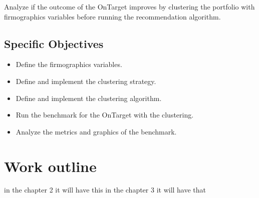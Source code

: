 Analyze if the outcome of the OnTarget improves by clustering the portfolio with firmographics variables before running the recommendation algorithm.

\subsection{Specific Objectives}

\begin{itemize}
    \item Define the firmographics variables.
    \item Define and implement the clustering strategy.
	\item Define and implement the clustering algorithm.
    \item Run the benchmark for the OnTarget with the clustering.
    \item Analyze the metrics and graphics of the benchmark.
\end{itemize}


\section{Work outline}

 in the chapter 2 it will have this
 in the chapter 3 it will have that